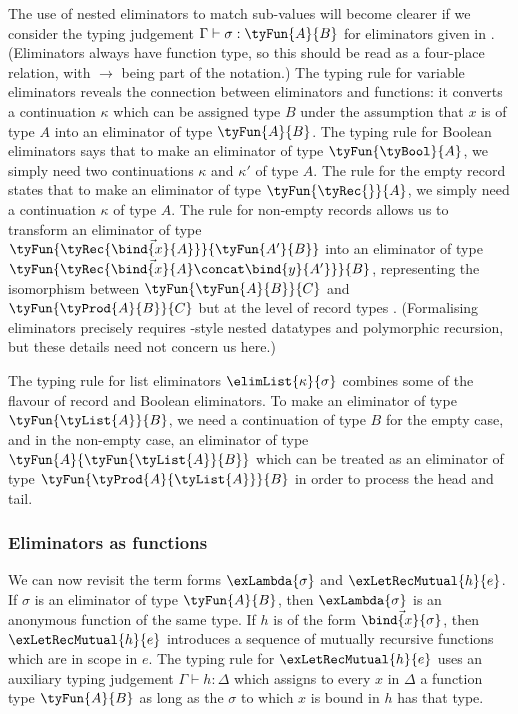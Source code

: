 

The use of nested eliminators to match sub-values will become clearer if we consider the typing judgement $\Gamma \vdash \sigma: \tyFun{A}{B}$ for eliminators given in . (Eliminators always have function type, so this should be read as a four-place relation, with $\to$ being part of the notation.) The typing rule for variable eliminators reveals the connection between eliminators and functions: it converts a continuation $\kappa$ which can be assigned type $B$ under the assumption that $x$ is of type $A$ into an eliminator of type $\tyFun{A}{B}$. The typing rule for Boolean eliminators says that to make an eliminator of type $\tyFun{\tyBool}{A}$, we simply need two continuations $\kappa$ and $\kappa'$ of type $A$. The rule for the empty record states that to make an eliminator of type $\tyFun{\tyRec{}}{A}$, we simply need a continuation $\kappa$ of type $A$. The rule for non-empty records allows us to transform an eliminator of type $\tyFun{\tyRec{\vec{\bind{x}{A}}}}{\tyFun{A'}{B}}$ into an eliminator of type $\tyFun{\tyRec{\vec{\bind{x}{A}} \concat \bind{y}{A'}}}{B}$, representing the isomorphism between $\tyFun{\tyFun{A}{B}}{C}$ and $\tyFun{\tyProd{A}{B}}{C}$ but at the level of record types \cite{hinze00}. (Formalising eliminators precisely requires \citeauthor{bird98}-style nested datatypes \cite{bird98} and polymorphic recursion, but these details need not concern us here.)

The typing rule for list eliminators $\elimList{\kappa}{\sigma}$ combines some of the flavour of record and Boolean eliminators. To make an eliminator of type $\tyFun{\tyList{A}}{B}$, we need a continuation of type $B$ for the empty case, and in the non-empty case, an eliminator of type $\tyFun{A}{\tyFun{\tyList{A}}{B}}$ which can be treated as an eliminator of type $\tyFun{\tyProd{A}{\tyList{A}}}{B}$ in order to process the head and tail.

\subsubsection{Eliminators as functions}

We can now revisit the term forms $\exLambda{\sigma}$ and $\exLetRecMutual{h}{e}$. If $\sigma$ is an eliminator of type $\tyFun{A}{B}$, then $\exLambda{\sigma}$ is an anonymous function of the same type. If $h$ is of the form $\vec{\bind{x}{\sigma}}$, then $\exLetRecMutual{h}{e}$ introduces a sequence of mutually recursive functions which are in scope in $e$. The typing rule for $\exLetRecMutual{h}{e}$ uses an auxiliary typing judgement $\Gamma \vdash h : \Delta$ which assigns to every $x$ in $\Delta$ a function type $\tyFun{A}{B}$ as long as the $\sigma$ to which $x$ is bound in $h$ has that type.

